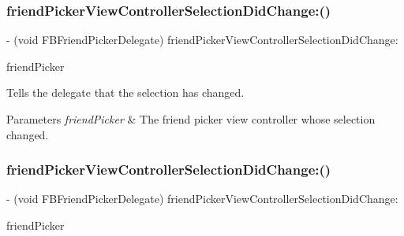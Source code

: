 \subsubsection{\texorpdfstring{friend\+Picker\+View\+Controller\+Selection\+Did\+Change\+:()}{friendPickerViewControllerSelectionDidChange:()}\hspace{0.1cm}{\footnotesize\ttfamily [3/5]}}
{\footnotesize\ttfamily -\/ (void F\+B\+Friend\+Picker\+Delegate) friend\+Picker\+View\+Controller\+Selection\+Did\+Change\+: \begin{DoxyParamCaption}\item[{(\hyperlink{interfaceFBFriendPickerViewController}{F\+B\+Friend\+Picker\+View\+Controller} $\ast$)}]{friend\+Picker }\end{DoxyParamCaption}\hspace{0.3cm}{\ttfamily [optional]}}

Tells the delegate that the selection has changed.


\begin{DoxyParams}{Parameters}
{\em friend\+Picker} & The friend picker view controller whose selection changed. \\
\hline
\end{DoxyParams}
\mbox{\label{protocolFBFriendPickerDelegate_01-p_a6b00500fbc7158e7b0b0155b44cd02f5}} 
\subsubsection{\texorpdfstring{friend\+Picker\+View\+Controller\+Selection\+Did\+Change\+:()}{friendPickerViewControllerSelectionDidChange:()}\hspace{0.1cm}{\footnotesize\ttfamily [4/5]}}
{\footnotesize\ttfamily -\/ (void F\+B\+Friend\+Picker\+Delegate) friend\+Picker\+View\+Controller\+Selection\+Did\+Change\+: \begin{DoxyParamCaption}\item[{(\hyperlink{interfaceFBFriendPickerViewController}{F\+B\+Friend\+Picker\+View\+Controller} $\ast$)}]{friend\+Picker }\end{DoxyParamCaption}\hspace{0.3cm}{\ttfamily [optional]}}

